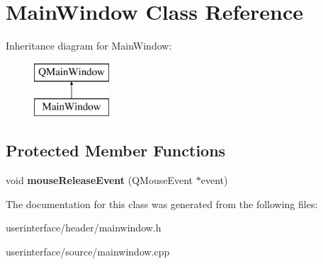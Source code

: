 \section{Main\-Window Class Reference}
\label{class_main_window}
Inheritance diagram for Main\-Window\-:\begin{figure}[H]
\begin{center}
\leavevmode
\includegraphics[height=2.000000cm]{class_main_window}
\end{center}
\end{figure}
\subsection*{Protected Member Functions}
\begin{DoxyCompactItemize}
\item 
void {\bfseries mouse\-Release\-Event} (Q\-Mouse\-Event $\ast$event)\label{class_main_window_a32bbb036a55856e49c31a5348f937b53}

\end{DoxyCompactItemize}


The documentation for this class was generated from the following files\-:\begin{DoxyCompactItemize}
\item 
userinterface/header/mainwindow.\-h\item 
userinterface/source/mainwindow.\-cpp\end{DoxyCompactItemize}
